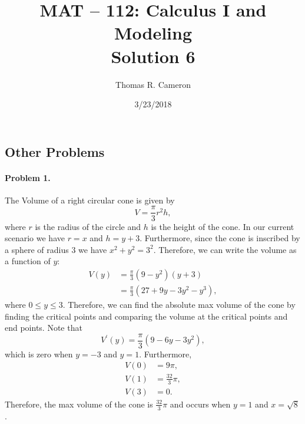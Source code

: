 \documentclass{article}
\title{MAT -- 112: Calculus I and Modeling\\
\large{Solution 6}}
\author{Thomas R. Cameron}
\date{3/23/2018}
\begin{document}
\maketitle

\subsection*{Other Problems}

\paragraph*{Problem 1.} The Volume of a right circular cone is given by
\[
V=\frac{\pi}{3}r^{2}h,
\]
where $r$ is the radius of the circle and $h$ is the height of the cone. In our current scenario we have $r=x$ and $h=y+3$. Furthermore, since the cone is inscribed by a sphere of radius $3$ we have $x^{2}+y^{2}=3^{2}$. Therefore, we can write the volume as a function of $y$:
\begin{align*}
V(y)&=\frac{\pi}{3}(9-y^{2})(y+3)\\
&=\frac{\pi}{3}(27+9y-3y^{2}-y^{3}),
\end{align*}
where $0\leq y\leq 3$. Therefore, we can find the absolute max volume of the cone by finding the critical points and comparing the volume at the critical points and end points. Note that
\[
V^{'}(y)=\frac{\pi}{3}(9-6y-3y^{2}),
\]
which is zero when $y=-3$ and $y=1$. Furthermore,
\begin{align*}
V(0)&=9\pi, \\
V(1)&=\frac{32}{3}\pi, \\
V(3)&=0.
\end{align*}
Therefore, the max volume of the cone is $\frac{32}{3}\pi$ and occurs when $y=1$ and $x=\sqrt{8}$. 
\end{document}
